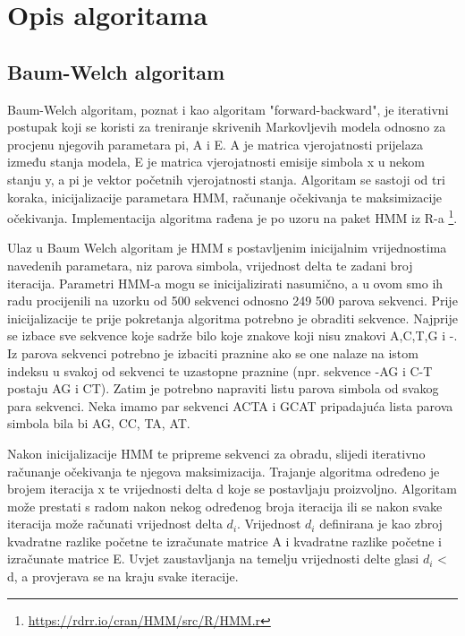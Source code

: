 \documentclass[times, utf8, seminar, numeric]{fer}
\begin{document}
\chapter{Opis algoritama}

\section{Baum-Welch algoritam}
Baum-Welch algoritam, poznat i kao algoritam "forward-backward", je iterativni postupak koji se koristi za treniranje skrivenih Markovljevih modela odnosno za procjenu njegovih parametara pi, A i E. A je matrica vjerojatnosti prijelaza između stanja modela, E je matrica vjerojatnosti emisije simbola x u nekom stanju y, a pi je vektor početnih vjerojatnosti stanja. Algoritam se sastoji od tri koraka, inicijalizacije parametara HMM, računanje očekivanja te maksimizacije očekivanja. Implementacija algoritma rađena je po uzoru na paket HMM iz R-a \footnote{\url{https://rdrr.io/cran/HMM/src/R/HMM.r}}. 

\bigskip
Ulaz u Baum Welch algoritam je HMM s postavljenim inicijalnim vrijednostima navedenih parametara, niz parova simbola, vrijednost delta te zadani broj iteracija. Parametri HMM-a mogu se inicijalizirati nasumično, a u ovom smo ih radu procijenili na uzorku od 500 sekvenci odnosno 249 500 parova sekvenci. Prije inicijalizacije te prije pokretanja algoritma potrebno je obraditi sekvence. Najprije se izbace sve sekvence koje sadrže bilo koje znakove koji nisu znakovi A,C,T,G i -.  Iz parova sekvenci potrebno je izbaciti praznine ako se one nalaze na istom indeksu u svakoj od sekvenci te uzastopne praznine (npr. sekvence -AG i C-T postaju AG i CT). Zatim je potrebno napraviti listu parova simbola od svakog para sekvenci. Neka imamo par sekvenci ACTA i GCAT pripadajuća lista parova simbola bila bi AG, CC, TA, AT.

\bigskip
Nakon inicijalizacije HMM te pripreme sekvenci za obradu, slijedi iterativno računanje očekivanja te 
njegova maksimizacija. Trajanje algoritma određeno je brojem iteracija x te vrijednosti delta d koje se 
postavljaju proizvoljno. Algoritam može prestati s radom nakon nekog određenog broja iteracija ili se 
nakon svake iteracija može računati vrijednost delta $d_i$. Vrijednost $d_i$ definirana je kao zbroj 
kvadratne razlike početne te izračunate matrice A i kvadratne razlike početne i izračunate matrice E. 
Uvjet zaustavljanja na temelju vrijednosti delte glasi $d_i$ < d, a provjerava se na kraju svake iteracije. 
\end{document}
